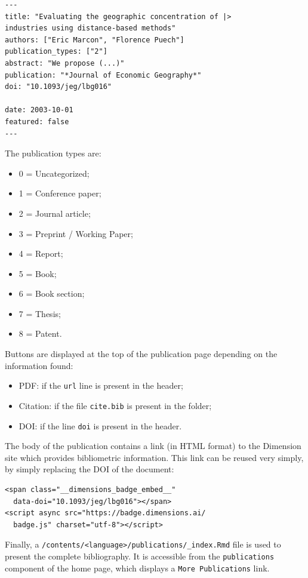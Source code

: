 \documentclass[
  12pt,
  american,
  a4paper,
  extrafontsizes,onecolumn,openright
  ]{memoir}
\providecommand{\tightlist}{%
  \setlength{\itemsep}{0pt}\setlength{\parskip}{0pt}}
\begin{document}
\begin{verbatim}
---
title: "Evaluating the geographic concentration of |>
industries using distance-based methods"
authors: ["Eric Marcon", "Florence Puech"]
publication_types: ["2"]
abstract: "We propose (...)"
publication: "*Journal of Economic Geography*"
doi: "10.1093/jeg/lbg016"

date: 2003-10-01
featured: false
---
\end{verbatim}

The publication types are:

\begin{itemize}
\tightlist
\item
  0 = Uncategorized;
\item
  1 = Conference paper;
\item
  2 = Journal article;
\item
  3 = Preprint / Working Paper;
\item
  4 = Report;
\item
  5 = Book;
\item
  6 = Book section;
\item
  7 = Thesis;
\item
  8 = Patent.
\end{itemize}

Buttons are displayed at the top of the publication page depending on the information found:

\begin{itemize}
\tightlist
\item
  PDF: if the \texttt{url} line is present in the header;
\item
  Citation: if the file \texttt{cite.bib} is present in the folder;
\item
  DOI: if the line \texttt{doi} is present in the header.
\end{itemize}

The body of the publication contains a link (in HTML format) to the Dimension site which provides bibliometric information.
This link can be reused very simply, by simply replacing the DOI of the document:

\begin{verbatim}
<span class="__dimensions_badge_embed__" 
  data-doi="10.1093/jeg/lbg016"></span>
<script async src="https://badge.dimensions.ai/
  badge.js" charset="utf-8"></script>
\end{verbatim}

Finally, a \texttt{/contents/\textless{}language\textgreater{}/publications/\_index.Rmd} file is used to present the complete bibliography.
It is accessible from the \texttt{publications} component of the home page, which displays a \texttt{More\ Publications} link.
\end{document}
